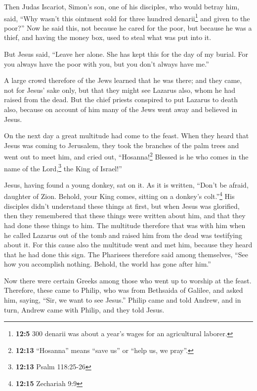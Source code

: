  Then Judas Iscariot, Simon's son, one of his disciples,
who would betray him, said,  ``Why wasn't this ointment
sold for three hundred denarii\footnote{\textbf{12:5} 300 denarii was
  about a year's wages for an agricultural laborer.} and given to the
poor?''  Now he said this, not because he cared for the
poor, but because he was a thief, and having the money box, used to
steal what was put into it.

 But Jesus said, ``Leave her alone. She has kept this for
the day of my burial.  For you always have the poor with
you, but you don't always have me.''

 A large crowd therefore of the Jews learned that he was
there; and they came, not for Jesus' sake only, but that they might see
Lazarus also, whom he had raised from the dead.  But the
chief priests conspired to put Lazarus to death also, 
because on account of him many of the Jews went away and believed in
Jesus.

 On the next day a great multitude had come to the feast.
When they heard that Jesus was coming to Jerusalem,  they
took the branches of the palm trees and went out to meet him, and cried
out, ``Hosanna!\footnote{\textbf{12:13} ``Hosanna'' means ``save us'' or
  ``help us, we pray''.} Blessed is he who comes in the name of the
Lord,\footnote{\textbf{12:13} Psalm 118:25-26} the King of Israel!''

 Jesus, having found a young donkey, sat on it. As it is
written,  ``Don't be afraid, daughter of Zion. Behold,
your King comes, sitting on a donkey's colt.''\footnote{\textbf{12:15}
  Zechariah 9:9}  His disciples didn't understand these
things at first, but when Jesus was glorified, then they remembered that
these things were written about him, and that they had done these things
to him.  The multitude therefore that was with him when
he called Lazarus out of the tomb and raised him from the dead was
testifying about it.  For this cause also the multitude
went and met him, because they heard that he had done this sign.
 The Pharisees therefore said among themselves, ``See how
you accomplish nothing. Behold, the world has gone after him.''

 Now there were certain Greeks among those who went up to
worship at the feast.  Therefore, these came to Philip,
who was from Bethsaida of Galilee, and asked him, saying, ``Sir, we want
to see Jesus.''  Philip came and told Andrew, and in
turn, Andrew came with Philip, and they told Jesus.


